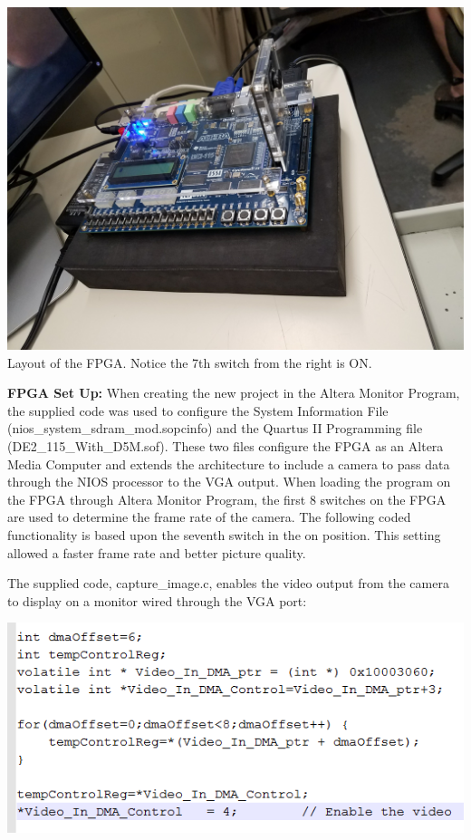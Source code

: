 \documentclass{article}
\newenvironment{Figure}
  {\par\medskip\noindent\ignorespaces\minipage{\linewidth}}
  {\endminipage\par\medskip}
\begin{document}
\begin{multicols*}{2}
\begin{Figure}
 \centering
 \includegraphics[width=\linewidth]{camera_switch_setup.jpg}
   {Layout of the FPGA. Notice the 7th switch from the right is ON.}
\end{Figure}

{\bf  FPGA Set Up: }
 When creating the new project in the Altera Monitor Program, the supplied code was used to configure the System Information File (nios\_system\_sdram\_mod.sopcinfo) and the Quartus II Programming file (DE2\_115\_With\_D5M.sof). These two files configure the FPGA as an Altera Media Computer and extends the architecture to include a camera to pass data through the NIOS processor to the VGA output. When loading the program on the FPGA through Altera Monitor Program, the first 8 switches on the FPGA are used to determine the frame rate of the camera. The following coded functionality is based upon the seventh switch in the on position. This setting allowed a faster frame rate and better picture quality.


The supplied code, capture\_image.c, enables the video output from the camera to display on a monitor wired through the VGA port:

\begin{Figure}
 \centering
 \includegraphics[width=\linewidth]{ccode.png}
\end{Figure}


\end{multicols*}
\end{document}
